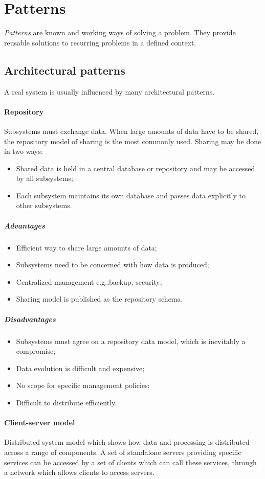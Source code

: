 \section{Patterns}
\emph{Patterns} are known and working ways of solving a problem. They provide reusable solutions to recurring problems in a defined context.

\subsection{Architectural patterns}
A real system is usually influenced by many architectural patterns.

\paragraph{Repository}
Subsystems must exchange data. When large amounts of data have to be shared, the repository model of sharing is the most commonly used. Sharing may be done in two ways:
\begin{itemize}
\item Shared data is held in a central database or repository and may be accessed by all subsystems;
\item Each subsystem maintains its own database and passes data explicitly to other subsystems.
\end{itemize}

\subparagraph{Advantages}
\begin{itemize}
\item Efficient way to share large amounts of data;
\item Subsystems need to be concerned with how data is produced;
\item Centralized management e.g.,\@ backup, security;
\item Sharing model is published as the repository schema.
\end{itemize}

\subparagraph{Disadvantages}
\begin{itemize}
\item Subsystems must agree on a repository data model, which is inevitably a compromise;
\item Data evolution is difficult and expensive;
\item No scope for specific management policies;
\item Difficult to distribute efficiently.
\end{itemize}

\paragraph{Client-server model}
Distributed system model which shows how data and processing is distributed across a range of components. A set of standalone servers providing specific services can be accessed by a set of clients which can call these services, through a network which allows clients to access servers.


